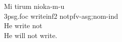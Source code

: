 \documentclass[grammar]{subfiles}
\begin{document}
  \begin{exe}
    \ex {}
    \glll Mi tirum nioka-m-u\\
  \acs{3p}\acs{sg}.\acs{foc} write\bs\acs{inf2} not\bs \acs{pfv}-\acs{asg};\acs{nom}-\acs{ind}\\
    {He} {write} {not}\\
    \glt He will not write.
  \end{exe}






%
\end{document}
